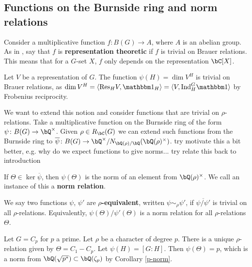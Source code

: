 \subsection{Functions on the Burnside ring and norm relations}

Consider a multiplicative function $f \colon B(G) \to A$, where $A$ is an abelian group. As in \cite{reg-const}, say that $f$ is \textbf{representation theoretic} if $f$ is trivial on Brauer relations. This means that for a $G$-set $X$, $f$ only depends on the representation $\bC[X]$. 

\begin{example}
  Let $V$ be a representation of $G$. The function $\psi(H) = \dim V^H$ is trivial on Brauer relations, as $\dim V^H = \langle \Res_{H} V , \trivial_H \rangle = \langle V, \Ind_{H}^G \trivial \rangle$ by Frobenius reciprocity.
\end{example}

We want to extend this notion and consider functions that are trivial on $\rho$-relations.
Take a multiplicative function on the Burnside ring of the form $\psi \colon B(G) \to \bQ^{\times}$. Given $\rho \in R_{\bC}(G)$ we can extend such functions from the Burnside ring to $\overline{\psi} \colon B(G) \to \bQ^{\times} / N_{\bQ(\rho) / \bQ}(\bQ(\rho)^\times)$. {\color{red} try motivate this a bit better, e.g. why do we expect functions to give norms... try relate this back to introduction}

\begin{defn}
If $\Theta \in \ker \overline{\psi}$, then $\psi(\Theta)$ is the norm of an element from $\bQ(\rho)^{\times}$. We call an instance of this a \textbf{norm relation}.
\end{defn}

\begin{defn}
 We say two functions $\psi$, $\psi'$ are \textbf{$\rho$-equivalent}, written $\psi \sim_{\rho} \psi'$, if $\overline{\psi /\psi'}$ is trivial on all $\rho$-relations. Equivalently, $\psi(\Theta) / \psi'(\Theta)$ is a norm relation for all $\rho$-relations $\Theta$. 
\end{defn}

\begin{example}
    Let $G = C_p$ for $p$ a prime. Let $\rho$ be a character of degree $p$. There is a unique $\rho$-relation given by $\Theta = C_1 - C_p$. Let $\psi(H) = [G \colon H]$. Then $\psi(\Theta) = p$, which is a norm from $\bQ(\sqrt{p^*}) \subset \bQ(\zeta_p)$ by Corollary \ref{p-norm}. 
\end{example}

